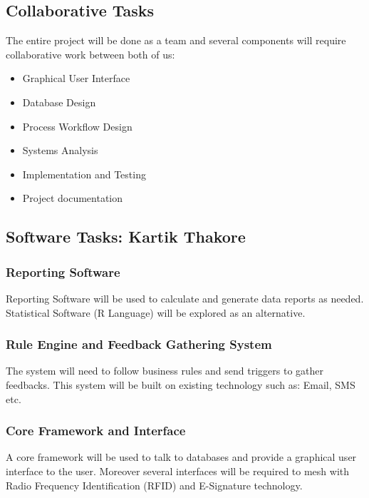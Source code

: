 \documentclass{journal}
\begin{document}
\subsection{ Collaborative Tasks }

The entire project will be done as a team and several components will require collaborative work between both of us:

\begin{itemize}
\item Graphical User Interface
\item Database  Design
\item Process Workflow Design
\item Systems Analysis
\item Implementation and Testing
\item Project documentation
\end{itemize}

\subsection{ Software Tasks: Kartik Thakore }

\subsubsection{Reporting Software}

Reporting Software will be used to calculate and generate data reports as needed. Statistical Software (R Language) will be explored as an alternative.

\subsubsection{Rule Engine and Feedback Gathering System}

The system will need to follow business rules and send triggers to gather feedbacks. This system will be built on existing technology such as: Email, SMS etc. 

\subsubsection{Core Framework and Interface}

A core framework will be used to talk to databases and provide a graphical user interface to the user. Moreover several interfaces will be required to mesh with Radio Frequency Identification (RFID) and E-Signature technology. 
\end{document}
